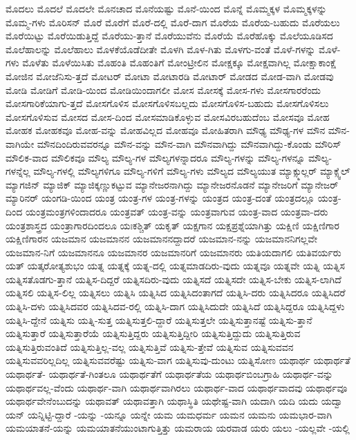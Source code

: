 {ಮೊದಲು
ಮೊದಲೆ
ಮೊದಲೇ
ಮೊನಚಾದ
ಮೊನೆಯಷ್ಟು
ಮೊನೆ-ಯಿಂದ
ಮೊನ್ನೆ
ಮೊಮ್ಮಕ್ಕಳ
ಮೊಮ್ಮಕ್ಕಳನ್ನು
ಮೊಮ್ಮ-ಗಳು
ಮೊರಿಸನ್
ಮೊರೆ
ಮೊರೆಗೆ
ಮೊರೆ-ದಲ್ಲಿ
ಮೊರೆ-ದಾಗ
ಮೊರೆಯ
ಮೊರೆಯ-ಬಹುದು
ಮೊರೆಯಲು
ಮೊರೆಯಿಟ್ಟು
ಮೊರೆಯಿಡುತ್ತಿದ್ದೆ
ಮೊರೆಯು-ತ್ತಾನೆ
ಮೊರೆಯುವೆನು
ಮೊರೆಯೆ
ಮೊರೆಹೊಕ್ಕು
ಮೊಲೆಯೂಡಿಸದ
ಮೊಲೆಹಾಲನ್ನು
ಮೊಲೆಹಾಲು
ಮೊಳಕೆಯೊಡೆದೀತೇ
ಮೊಳಗಿ
ಮೊಳ-ಗಿತು
ಮೊಳಗು-ವಂತೆ
ಮೊಳೆ-ಗಳನ್ನು
ಮೊಳೆ-ಗಳು
ಮೊಳೆತು
ಮೊಳೆಯಿಸಿತು
ಮೊಹಂತಿ
ಮೊಹಂತಿಗೆ
ಮೋಂಟ್ರೀಲಿನ
ಮೋಕ್ಷಕ್ಕೂ
ಮೋಕ್ಷವಾಗಿಲ್ಲ
ಮೋಕ್ಷಾಕಾಂಕ್ಷೆ
ಮೋಜಿನ
ಮೋಜೆನಿಸು-ತ್ತದೆ
ಮೋಟರ್
ಮೋಟಾ
ಮೋಟಾರಡಿ
ಮೋಟಾರ್
ಮೋಡದ
ಮೋಡ-ವಾಗಿ
ಮೋಡವು
ಮೋಡಿ
ಮೋಡಿಗೆ
ಮೋಡಿ-ಯಿಂದ
ಮೋಡಿಯಿಂದಾಗಲೀ
ಮೋಸ
ಮೋಸಕ್ಕೆ
ಮೋಸ-ಗಳು
ಮೋಸಗಾರರೆಂದು
ಮೋಸಗಾರಿಕೆಯಾಗು-ತ್ತದೆ
ಮೋಸಗೊಳಿಸ
ಮೋಸಗೊಳಿಸಬಲ್ಲದು
ಮೋಸಗೊಳಿಸ-ಬಹುದು
ಮೋಸಗೊಳಿಸಲು
ಮೋಸಗೊಳಿಸುವ
ಮೋಸದ
ಮೋಸ-ದಿಂದ
ಮೋಸಮಾಡಿಕೊಳ್ಳುವ
ಮೋಸವಿರಬಹುದೆಂಬ
ಮೋಸವೂ
ಮೋಹ
ಮೋಹಕ
ಮೋಹಕವೂ
ಮೋಹ-ವನ್ನು
ಮೋಹವಿಲ್ಲದ
ಮೋಹವೂ
ಮೋಹಿತರಾಗಿ
ಮೌಢ್ಯ
ಮೌಢ್ಯ-ಗಳ
ಮೌನ
ಮೌನ-ವಾಗಿಯೇ
ಮೌನದಿಂದಿರುವವರನ್ನೂ
ಮೌನ-ವನ್ನು
ಮೌನ-ವಾಗಿ
ಮೌನವಾಗಿದ್ದು
ಮೌನವಾಗಿದ್ದು-ಕೊಂಡು
ಮೌರಿಸ್
ಮೌಲಿಕ-ವಾದ
ಮೌಲಿಕವೂ
ಮೌಲ್ಯ
ಮೌಲ್ಯ-ಗಳ
ಮೌಲ್ಯಗಳನ್ನಾದರೂ
ಮೌಲ್ಯ-ಗಳನ್ನು
ಮೌಲ್ಯ-ಗಳನ್ನೂ
ಮೌಲ್ಯ-ಗಳನ್ನೆಲ್ಲ
ಮೌಲ್ಯ-ಗಳಲ್ಲಿ
ಮೌಲ್ಯಗಳಿಗೂ
ಮೌಲ್ಯ-ಗಳಿಗೆ
ಮೌಲ್ಯ-ಗಳು
ಮೌಲ್ಯದ
ಮೌಲ್ಯಯುತ
ಮ್ಯಾಕ್ಸ್ಮುಲ್ಲರ್
ಮ್ಯಾಕ್ಸ್ವೆಲ್
ಮ್ಯಾಗಜಿನ್
ಮ್ಯಾಜಿಕ್
ಮ್ಯಾಜಿಕ್ಕಣ್ಣುಕಟ್ಟುವ
ಮ್ಯಾನೇಜರನಾಗಿದ್ದು
ಮ್ಯಾನೇಜರನೊಡನೆ
ಮ್ಯಾನೇಜರಿಗೆ
ಮ್ಯಾನೇಜರ್
ಮ್ಯಾರಿನರ್
ಯಂಗಡಿ-ಯಿಂದ
ಯಂತ್ರ
ಯಂತ್ರ-ಗಳ
ಯಂತ್ರ-ಗಳನ್ನು
ಯಂತ್ರದ
ಯಂತ್ರ-ದಂತೆ
ಯಂತ್ರದಲ್ಲೂ
ಯಂತ್ರ-ದಿಂದ
ಯಂತ್ರಮಂತ್ರಗಳಿಂದಾದರೂ
ಯಂತ್ರವತ್
ಯಂತ್ರ-ವನ್ನು
ಯಂತ್ರವಾಗುವ
ಯಂತ್ರ-ವಾದ
ಯಂತ್ರವಾ-ದರು
ಯಂತ್ರಶಾಸ್ತ್ರದ
ಯಂತ್ರಾಗಾರದಿಂದಲೂ
ಯಃಕಶ್ಚಿತ್
ಯಕೃತ್
ಯಕ್ಷಗಾನ
ಯಕ್ಷಪ್ರಶ್ನೆಯಾಗಿತ್ತು
ಯಕ್ಷಿಣಿ
ಯಕ್ಷಿಣಿಗಾರ
ಯಕ್ಷಿಣಿಗಾರನ
ಯಜಮಾನ
ಯಜಮಾನನ
ಯಜಮಾನನದ್ದಾದರೆ
ಯಜಮಾನ-ನನ್ನು
ಯಜಮಾನನಿಗಲ್ಲವೇ
ಯಜಮಾನ-ನಿಗೆ
ಯಜಮಾನನೂ
ಯಜಮಾನರ
ಯಜಮಾನರಿಗೆ
ಯಜಮಾನರು
ಯತಿಯದಾಗಲಿ
ಯತಿವರ್ಯರು
ಯತ್
ಯತ್ಕರೋತ್ಯಶುಭಂ
ಯತ್ನ
ಯತ್ನಕ್ಕೆ
ಯತ್ನ-ದಲ್ಲಿ
ಯತ್ನಮಾಡದಿರು-ವುದು
ಯತ್ನವೂ
ಯತ್ನವೇ
ಯತ್ನಿ
ಯತ್ನಿಸ
ಯತ್ನಿಸತೊಡಗು-ತ್ತಾನೆ
ಯತ್ನಿಸ-ದಿದ್ದರೆ
ಯತ್ನಿಸದಿರು-ವುದು
ಯತ್ನಿಸದೆ
ಯತ್ನಿಸದೇ
ಯತ್ನಿಸ-ಬೇಕು
ಯತ್ನಿಸ-ಲಾಗಿದೆ
ಯತ್ನಿಸಲಿ
ಯತ್ನಿಸ-ಲಿಲ್ಲ
ಯತ್ನಿಸಲು
ಯತ್ನಿಸಿ
ಯತ್ನಿಸಿದ
ಯತ್ನಿಸಿದಂತಾಗದೆ
ಯತ್ನಿಸಿ-ದರು
ಯತ್ನಿಸಿದರೂ
ಯತ್ನಿಸಿದರೆ
ಯತ್ನಿಸಿ-ದಳು
ಯತ್ನಿಸಿದವರ
ಯತ್ನಿಸಿದವ-ರಲ್ಲಿ
ಯತ್ನಿಸಿ-ದಾಗ
ಯತ್ನಿಸಿದುದೇ
ಯತ್ನಿಸಿದೆ
ಯತ್ನಿಸಿದ್ದರೂ
ಯತ್ನಿಸಿದ್ದಳು
ಯತ್ನಿಸಿ-ದ್ದೇನೆ
ಯತ್ನಿಸು
ಯತ್ನಿ-ಸುತ್ತ
ಯತ್ನಿಸುತ್ತಲಿ-ದ್ದಾರೆ
ಯತ್ನಿಸುತ್ತಲೇ
ಯತ್ನಿಸುತ್ತಾನಷ್ಟೆ
ಯತ್ನಿಸು-ತ್ತಾನೆ
ಯತ್ನಿಸುತ್ತಾರೆ
ಯತ್ನಿಸುತ್ತಾರೆಯೆ
ಯತ್ನಿಸುತ್ತಿದ್ದರು
ಯತ್ನಿಸುತ್ತಿದ್ದೀರಿ
ಯತ್ನಿಸುತ್ತಿದ್ದುದು
ಯತ್ನಿಸುತ್ತಿರುವ
ಯತ್ನಿಸುತ್ತಿರುವಂತಿದೆ
ಯತ್ನಿಸುತ್ತಿಲ್ಲ-ವಲ್ಲ
ಯತ್ನಿಸುತ್ತಿವೆ
ಯತ್ನಿಸು-ತ್ತೇವೆ
ಯತ್ನಿಸುವ
ಯತ್ನಿಸುವವನ
ಯತ್ನಿಸುವವರಿಲ್ಲದಿಲ್ಲ
ಯತ್ನಿಸುವವರೆಷ್ಟು
ಯತ್ನಿಸು-ವಾಗ
ಯತ್ನಿಸುವು-ದುಂಟು
ಯತ್ನಿಸೋಣ
ಯಥಾರ್ಥ
ಯಥಾರ್ಥತೆ
ಯಥಾರ್ಥತೆ-
ಯಥಾರ್ಥತೆ-ಗಿಂತಲೂ
ಯಥಾರ್ಥತೆಗೆ
ಯಥಾರ್ಥತೆಯ
ಯಥಾರ್ಥಬಿಂಬಗ್ರಾಹಿ
ಯಥಾರ್ಥ-ವನ್ನು
ಯಥಾರ್ಥವಲ್ಲ-ವೆಂದು
ಯಥಾರ್ಥ-ವಾಗಿ
ಯಥಾರ್ಥವಾಗಿರಲು
ಯಥಾರ್ಥ-ವಾದ
ಯಥಾರ್ಥವಾದವು
ಯಥಾರ್ಥವೂ
ಯಥಾರ್ಥವೇನೆಂಬುದನ್ನು
ಯಥಾವತ್
ಯಥಾವತ್ತಾಗಿ
ಯಥಾಸ್ಥಿತಿ
ಯಥೇಷ್ಟ-ವಾಗಿ
ಯದಾಗಿ
ಯದಿ
ಯದು
ಯದ್ವಾ
ಯನ್
ಯನ್ನಿಟ್ಟಿ-ದ್ದಾರೆ
-ಯನ್ನು
-ಯನ್ನೂ
ಯನ್ನೇ
ಯಮ
ಯಮಧರ್ಮ
ಯಮನ
ಯಮನು
ಯಮಭಾರ-ವಾಗಿ
ಯಮಯಾತನೆ-ಯನ್ನು
ಯಮಯಾತನೆಯುಂಟಾಗುತ್ತಿತ್ತು
ಯಮರಾಯ
ಯರವಾಡ
ಯರು
ಯಲು
-ಯಲ್ಲವೇ
-ಯಲ್ಲಿ
}
